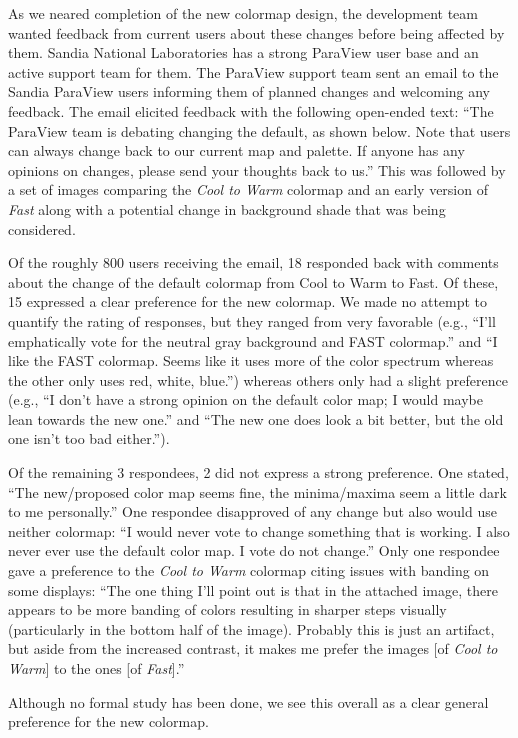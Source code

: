 \documentclass{IEEEcsmag}
\newcommand*{\colormap}[1]{\textsl{#1}\xspace}
\newcommand*{\coolwarm}{\colormap{Cool to Warm}}
\newcommand*{\fast}{\colormap{Fast}}
\begin{document}
As we neared completion of the new colormap design, the development team wanted feedback from current users about these changes before being affected by them.
Sandia National Laboratories has a strong ParaView user base and an active support team for them.
The ParaView support team sent an email to the Sandia ParaView users informing them of planned changes and welcoming any feedback.
The email elicited feedback with the following open-ended text: ``The ParaView team is debating changing the default, as shown below. Note that users can always change back to our current map and palette. If anyone has any opinions on changes, please send your thoughts back to us.''
This was followed by a set of images comparing the \coolwarm colormap and an early version of \fast along with a potential change in background shade that was being considered.

Of the roughly 800 users receiving the email, 18 responded back with comments about the change of the default colormap from Cool to Warm to Fast.
Of these, 15 expressed a clear preference for the new colormap.
We made no attempt to quantify the rating of responses, but they ranged from very favorable (e.g., ``I’ll emphatically vote for the neutral gray background and FAST colormap.'' and ``I like the FAST colormap. Seems like it uses more of the color spectrum whereas the other only uses red, white, blue.'') whereas others only had a slight preference (e.g., ``I don’t have a strong opinion on the default color map; I would maybe lean towards the new one.'' and ``The new one does look a bit better, but the old one isn’t too bad either.'').

Of the remaining 3 respondees, 2 did not express a strong preference.
One stated, ``The new/proposed color map seems fine, the minima/maxima seem a little dark to me personally.''
One respondee disapproved of any change but also would use neither colormap: ``I would never vote to change something that is working.  I also never ever use the default color map. I vote do not change.''
Only one respondee gave a preference to the \coolwarm colormap citing issues with banding on some displays: ``The one thing I’ll point out is that in the attached image, there appears to be more banding of colors resulting in sharper steps visually (particularly in the bottom half of the image). Probably this is just an artifact, but aside from the increased contrast, it makes me prefer the images [of \coolwarm{}] to the ones [of \fast{}].''

Although no formal study has been done, we see this overall as a clear general preference for the new colormap.
\end{document}
